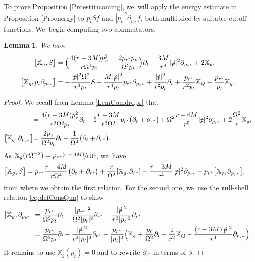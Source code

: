 \documentclass[10pt]{amsart}
\newcommand{\psfrac}[2]{\sfrac{(#1)}{#2}}
\theoremstyle{plain}
\newtheorem{lemma}[proposition]{Lemma}
\theoremstyle{definition}
\newcommand\T{{\mathbb{X}}}
\begin{document}
To prove Proposition \ref{Proestiincoming}, we~will apply the energy estimate in Proposition \ref{Proenergy} to $p_t Sf$ and $|p_t|^2 \partial_{p_{r^*}}f$, both multiplied by suitable cutoff functions. We~begin computing two commutators.

\begin{lemma}\label{LemComdrdprbis}
We have
\begin{align*}
\bigl[\T_g,S\bigr] &= \Bigl(\frac{4(r-3M)p_v^2}{r \Omega^4p_t}-\frac{2p_{r^*}p_v}{ \Omega^2p_t} \Bigr)\partial_t - \frac{3M}{r^4} |\slashed{p}|^2 \partial_{p_{r^*}}+2\T_g, \\
\bigl[ \T_g, p_t \partial_{p_{r^*}} \bigr] & = -\frac{|\slashed{p}|^2\Omega^2}{r^3 p_t} S-\frac{M|\slashed{p}|^2}{r^4 p_t}p_{r^*} \partial_{p_{r^*}}+\frac{|\slashed{p}|^2}{r^2 p_t} \partial_t+\frac{p_{r^*}}{r^2 p_t} \T_Q -\frac{p_{r^*}}{ p_t} \T_g.
\end{align*}
\end{lemma}
\begin{proof}
We recall from Lemma \ref{LemComdrdpr} that
\begin{align*}
[\T_g,\partial_{r^*}] &= \frac{4(r-3M)p_v^2}{r^2 \Omega^2p_t} \partial_t-2\frac{r-3M}{r^2 \Omega^2}p_{r^*}\bigl(\partial_t+ \partial_{r^*}\bigr)+ \Omega^2 \frac{r-6M}{r^5} |\slashed{p}|^2 \partial_{p_{r^*}}+2\frac{\Omega^2}{r}\T_g, \\[2pt]
\bigl[ \T_g, \partial_{p_{r^*}} \bigr] \! & = \frac{2p_v}{ \Omega^2p_t} \partial_t- \frac{1}{\Omega^2}\bigl(\partial_t+ \partial_{r^*} \bigr).
\end{align*}
As $ \T_g (r \Omega^{-2})=p_{r^*}\psfrac{r-4M}{r\Omega^4}$, we~have
\begin{align*}
\bigl[\T_g,S\bigr] &=p_{r^*}\frac{r-4M}{r\Omega^4}\bigl(\partial_t+\partial_{r^*} \bigr) +\frac{r}{\Omega^2} [\T_g,\partial_{r^*}]-\frac{r-3M}{r^4}|\slashed{p}|^2 \partial_{p_{r^*}}-p_{r^*} \bigl[ \T_g, \partial_{p_{r^*}} \bigr],
\end{align*}
from where we obtain the first relation. For the second one, we~use the null-shell relation \eqref{eq:defConsQua} to show
\begin{align*}
\bigl[ \T_g, \partial_{p_{r^*}} \bigr] & = \frac{p_{r^*}}{\Omega^2 p_t} \partial_t-\frac{|p_{r^*}|^2}{\Omega^2|p_t|^2} \partial_{r^*}-\frac{|\slashed{p}|^2}{r^2 |p_t|^2} \partial_{r^*} \\
& = \frac{p_{r^*}}{\Omega^2 p_t} \partial_t-\frac{|\slashed{p}|^2}{r^2 |p_t|^2} \partial_{r^*}-\frac{p_{r^*}}{ |p_t|^2}\Bigl(\T_g+\frac{p_t}{\Omega^2} \partial_t-\frac{1}{r^2} \T_Q-\frac{(r-3M)|\slashed{p}|^2}{r^4} \partial_{p_{r^*}} \Bigr).
\end{align*}
It remains to use $\T_g(p_t)=0$ and to rewrite $\partial_{r^*}$ in terms of $S$.
\end{proof}
\end{document}
